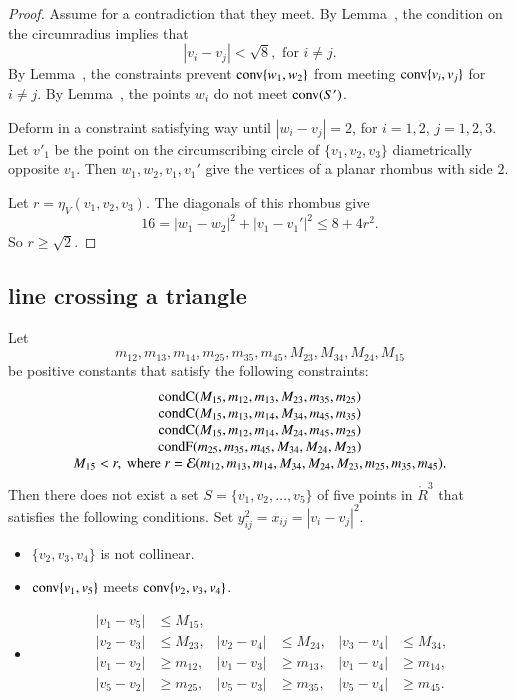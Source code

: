 \begin{proof}  Assume for a contradiction that they meet. 
By Lemma~, the condition on the circumradius implies that
	$$|v_i-v_j| < \sqrt8, \text{ for } i\ne j.$$
By Lemma~, the constraints prevent 	${\operatorname{conv}}\{w_1,w_2\}$
from meeting ${\operatorname{conv}}\{v_i,v_j\}$ for $i\ne j$.  By Lemma~,
the points $w_i$ do not meet ${\operatorname{conv}}(S')$.

Deform in a constraint satisfying way until $|w_i-v_j|=2$, for
$i=1,2$, $j=1,2,3$.    Let $v'_1$ be the
point on the circumscribing circle of $\{v_1,v_2,v_3\}$ diametrically
opposite $v_1$.  Then $w_1,w_2,v_1,v_1'$ give the vertices of a planar
rhombus with side $2$.

Let $r=\eta_V(v_1,v_2,v_3)$. The diagonals of this rhombus give
   $$
   16 = |w_1-w_2|^2 + |v_1-v_1'|^2 \le 8 + 4 r^2.
   $$
So $r\ge\sqrt2$.
\end{proof}

\newpage


\subsection{line crossing a triangle}

\begin{lemma}
Let $$m_{12},m_{13},m_{14},m_{25},m_{35},m_{45},M_{23},M_{34},M_{24},M_{15}$$ 
be positive constants that satisfy the following constraints:
	$$
	\begin{array}{clll}
	{\operatorname{condC}}(M_{15},m_{12},m_{13},M_{23},m_{35},m_{25})\\
	{\operatorname{condC}}(M_{15},m_{13},m_{14},M_{34},m_{45},m_{35})\\
	{\operatorname{condC}}(M_{15},m_{12},m_{14},M_{24},m_{45},m_{25})\\
	{\operatorname{condF}}(m_{25},m_{35},m_{45},M_{34},M_{24},M_{23})\\
	M_{15} < r, \text{ where } 
	r = {\mathcal E}(m_{12},m_{13},m_{14},M_{34},M_{24},M_{23},m_{25},m_{35},m_{45}).
	\end{array}
	$$
Then there does not exist a set $S=\{v_1,v_2,\ldots,v_5\}$ of five
points  in $\ring{R}^3$ that satisfies the following conditions.  
Set $y_{ij}^2 = x_{ij} = |v_i-v_j|^2$.
	\begin{itemize}
	\item $\{v_2,v_3,v_4\}$ is not collinear.
	\item ${\operatorname{conv}}\{v_1,v_5\}$ meets ${\operatorname{conv}}\{v_2,v_3,v_4\}$.
	\item 
		$$
		\begin{array}{rlrlrl}
		|v_1-v_5| &\le M_{15},\\
		|v_2-v_3| &\le M_{23}, &|v_2-v_4| &\le M_{24}, & |v_3-v_4|&\le M_{34},\\
		|v_1-v_2| &\ge m_{12},&|v_1-v_3| &\ge m_{13},& |v_1-v_4|&\ge m_{14},\\
		|v_5-v_2| &\ge m_{25},&|v_5-v_3| &\ge m_{35},& |v_5-v_4|&\ge m_{45}.\\
		\end{array}
		$$
	\end{itemize}
\end{lemma}

